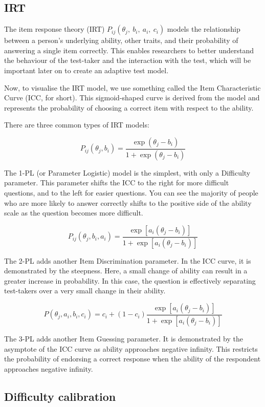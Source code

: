 \documentclass{article}
\begin{document}
\subsection*{IRT}

The item response theory (IRT) $P_{ij}\left(\theta_j,\ b_i,\ a_i,\ c_i\right)$ models the relationship between a person's underlying ability, other traits, and their probability of answering a single item correctly. This enables researchers to better understand the behaviour of the test-taker and the interaction with the test, which will be important later on to create an adaptive test model.

Now, to visualise the IRT model, we use something called the Item Characteristic Curve (ICC, for short). This sigmoid-shaped curve is derived from the model and represents the probability of choosing a correct item with respect to the ability. 

There are three common types of IRT models:

\[
P_{ij}\left(\theta_j,b_i\right)=\frac{\exp(\theta_j-b_i)}{1+\exp(\theta_j-b_i)}
\]

The 1-PL (or Parameter Logistic) model is the simplest, with only a Difficulty parameter. This parameter shifts the ICC to the right for more difficult questions, and to the left for easier questions. You can see the majority of people who are more likely to answer correctly shifts to the positive side of the ability scale as the question becomes more difficult.

\[
P_{ij}\left(\theta_j,b_i,a_i\right)=\frac{\exp\left[a_i(\theta_j-b_i)\right]}{1+\exp\left[a_i(\theta_j-b_i)\right]}
\]

The 2-PL adds another Item Discrimination parameter. In the ICC curve, it is demonstrated by the steepness. Here, a small change of ability can result in a greater increase in probability. In this case, the question is effectively separating test-takers over a very small change in their ability.

\[
P(\theta_j,a_i,b_i,c_i)=c_i+(1-c_i)\frac{\exp\left[a_i(\theta_j-b_i)\right]}{1+\exp\left[a_i(\theta_j-b_i)\right]}
\]

The 3-PL adds another Item Guessing parameter. It is demonstrated by the asymptote of the ICC curve as ability approaches negative infinity. This restricts the probability of endorsing a correct response when the ability of the respondent approaches negative infinity.

\subsection*{Difficulty calibration}
\end{document}
